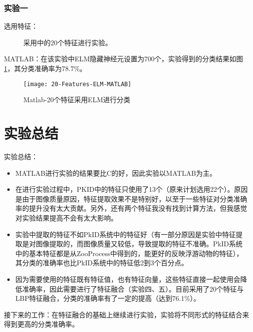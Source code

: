 \subsubsection{实验一}
\begin{description}
\item[选用特征：] 采用\label{shiyan3}中的20个特征进行实验。
\end{description}
MATLAB：在该实验中ELM隐藏神经元设置为700个，实验得到的分类结果如图\ref{fig:20-Features-ELM-MATLAB}，其分类准确率为78.7\%。
\begin{figure}[!ht]
\centering
\texttt{[image: 20-Features-ELM-MATLAB]}
\caption{Matlab-20个特征采用ELM进行分类}
\label{fig:20-Features-ELM-MATLAB}
\end{figure}


\section{实验总结}
实验总结：
\begin{itemize}
\item MATLAB进行实验的结果要比C的好，因此实验以MATLAB为主。
\item 在进行实验过程中，PKID中的特征只使用了13个（原来计划选用22个）。原因是由于图像质量原因，特征提取效果不是特别好，以至于一些特征对分类准确率的提升没有太大贡献。另外，还有两个特征我没有找到计算方法，但我感觉对实验结果提高不会有太大影响。
\item 实验中提取的特征不如PkID系统中的特征好（有一部分原因是实验中特征提取是对图像提取的，而图像质量又较低，导致提取的特征不准确。PkID系统中的基本特征都是从ZooProcess中得到的，能更好的反映浮游动物的特征），其分类的准确率也比PkID系统中的特征低2到3个百分点。
\item 因为需要使用的特征既有特征值，也有特征向量，这些特征直接一起使用会降低准确率，因此需要进行了特征融合（实验四、五）。目前采用了20个特征与LBP特征融合，分类的准确率有了一定的提高（达到76.1\%）。
\end{itemize}

接下来的工作：在特征融合的基础上继续进行实验，实验将不同形式的特征结合来得到更高的分类准确率。
